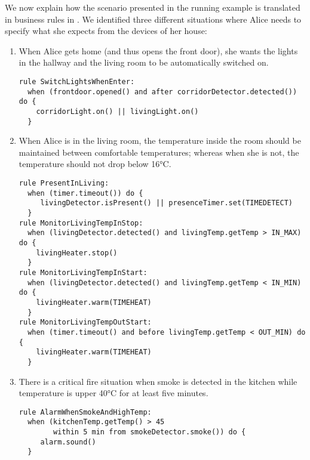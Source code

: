 We now explain how the scenario presented in the running example is translated in business rules in \IOTDSL. We identified three different situations where Alice needs to specify what she expects from the devices of her house:
\begin{enumerate}
	\item When Alice gets home (and thus opens the front door), she wants the lights in the hallway and the living room to be automatically switched on. 

\begin{lstlisting}[language=iotdsl]
rule SwitchLightsWhenEnter:
  when (frontdoor.opened() and after corridorDetector.detected()) do {
    corridorLight.on() || livingLight.on()
  }
\end{lstlisting}	
	
	\item When Alice is in the living room, the temperature inside the room should be maintained between comfortable temperatures; whereas when she is not, the temperature should not drop below 16°C.
	
	
\begin{lstlisting}[language=iotdsl]
rule PresentInLiving:	
  when (timer.timeout()) do {
     livingDetector.isPresent() || presenceTimer.set(TIMEDETECT)
  }
rule MonitorLivingTempInStop:
  when (livingDetector.detected() and livingTemp.getTemp > IN_MAX) do {
    livingHeater.stop()
  }
rule MonitorLivingTempInStart:
  when (livingDetector.detected() and livingTemp.getTemp < IN_MIN) do {
    livingHeater.warm(TIMEHEAT)
  }
rule MonitorLivingTempOutStart:
  when (timer.timeout() and before livingTemp.getTemp < OUT_MIN) do {
    livingHeater.warm(TIMEHEAT)
  }
\end{lstlisting}
	
	\item There is a critical fire situation when smoke is detected in the kitchen while temperature is upper 40°C for at least five minutes.

\begin{lstlisting}[language=iotdsl]
rule AlarmWhenSmokeAndHighTemp:	
  when (kitchenTemp.getTemp() > 45 
        within 5 min from smokeDetector.smoke()) do {
     alarm.sound()
  }
\end{lstlisting}
\end{enumerate}


